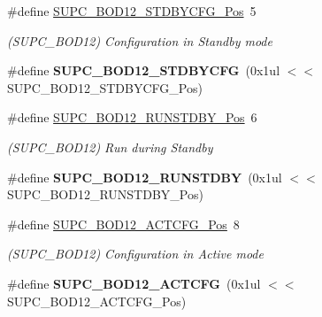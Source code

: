 \begin{DoxyCompactItemize}
\item 
\hypertarget{group___s_a_m_l21___s_u_p_c_ga10a4c347fc3f05a9ecf2cbabc1a2b7f1}{}\#define \hyperlink{group___s_a_m_l21___s_u_p_c_ga10a4c347fc3f05a9ecf2cbabc1a2b7f1}{S\+U\+P\+C\+\_\+\+B\+O\+D12\+\_\+\+S\+T\+D\+B\+Y\+C\+F\+G\+\_\+\+Pos}~5\label{group___s_a_m_l21___s_u_p_c_ga10a4c347fc3f05a9ecf2cbabc1a2b7f1}

\begin{DoxyCompactList}\small\item\em (S\+U\+P\+C\+\_\+\+B\+O\+D12) Configuration in Standby mode \end{DoxyCompactList}\item 
\hypertarget{group___s_a_m_l21___s_u_p_c_gaf23bb4fb085801d1793005402edd574d}{}\#define {\bfseries S\+U\+P\+C\+\_\+\+B\+O\+D12\+\_\+\+S\+T\+D\+B\+Y\+C\+F\+G}~(0x1ul $<$$<$ S\+U\+P\+C\+\_\+\+B\+O\+D12\+\_\+\+S\+T\+D\+B\+Y\+C\+F\+G\+\_\+\+Pos)\label{group___s_a_m_l21___s_u_p_c_gaf23bb4fb085801d1793005402edd574d}

\item 
\hypertarget{group___s_a_m_l21___s_u_p_c_ga7be90252c23fbebe809e130b000a5ac9}{}\#define \hyperlink{group___s_a_m_l21___s_u_p_c_ga7be90252c23fbebe809e130b000a5ac9}{S\+U\+P\+C\+\_\+\+B\+O\+D12\+\_\+\+R\+U\+N\+S\+T\+D\+B\+Y\+\_\+\+Pos}~6\label{group___s_a_m_l21___s_u_p_c_ga7be90252c23fbebe809e130b000a5ac9}

\begin{DoxyCompactList}\small\item\em (S\+U\+P\+C\+\_\+\+B\+O\+D12) Run during Standby \end{DoxyCompactList}\item 
\hypertarget{group___s_a_m_l21___s_u_p_c_ga425f8c5806efaf9d50ed28c6862156f4}{}\#define {\bfseries S\+U\+P\+C\+\_\+\+B\+O\+D12\+\_\+\+R\+U\+N\+S\+T\+D\+B\+Y}~(0x1ul $<$$<$ S\+U\+P\+C\+\_\+\+B\+O\+D12\+\_\+\+R\+U\+N\+S\+T\+D\+B\+Y\+\_\+\+Pos)\label{group___s_a_m_l21___s_u_p_c_ga425f8c5806efaf9d50ed28c6862156f4}

\item 
\hypertarget{group___s_a_m_l21___s_u_p_c_gadfa134ee78af92135eaa6e998894a713}{}\#define \hyperlink{group___s_a_m_l21___s_u_p_c_gadfa134ee78af92135eaa6e998894a713}{S\+U\+P\+C\+\_\+\+B\+O\+D12\+\_\+\+A\+C\+T\+C\+F\+G\+\_\+\+Pos}~8\label{group___s_a_m_l21___s_u_p_c_gadfa134ee78af92135eaa6e998894a713}

\begin{DoxyCompactList}\small\item\em (S\+U\+P\+C\+\_\+\+B\+O\+D12) Configuration in Active mode \end{DoxyCompactList}\item 
\hypertarget{group___s_a_m_l21___s_u_p_c_ga24257b3b7be04fbf8cea707bf7418cc3}{}\#define {\bfseries S\+U\+P\+C\+\_\+\+B\+O\+D12\+\_\+\+A\+C\+T\+C\+F\+G}~(0x1ul $<$$<$ S\+U\+P\+C\+\_\+\+B\+O\+D12\+\_\+\+A\+C\+T\+C\+F\+G\+\_\+\+Pos)\label{group___s_a_m_l21___s_u_p_c_ga24257b3b7be04fbf8cea707bf7418cc3}


\end{DoxyCompactItemize}
